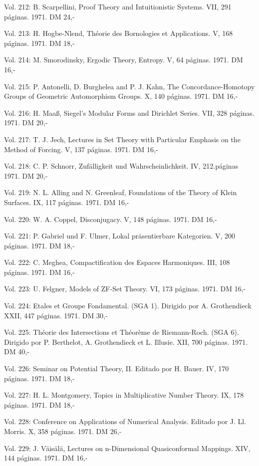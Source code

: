 Vol. 212: B. Scarpellini, Proof Theory and Intuitionistic Systems. VII, 291 páginas. 1971. DM 24,-

Vol. 213: H. Hogbe-Nlend, Théorie des Bornologies et Applications. V, 168 páginas. 1971. DM 18,-

Vol. 214: M. Smorodinsky, Ergodic Theory, Entropy. V, 64 páginas. 1971. DM 16,-

Vol. 215: P. Antonelli, D. Burghelea and P. J. Kahn, The Concordance-Homotopy Groups of Geometric Automorphism Groups. X, 140 páginas. 1971. DM 16,-

Vol. 216: H. Maaß, Siegel's Modular Forms and Dirichlet Series. VII, 328 páginas. 1971. DM 20,-

Vol. 217: T. J. Jech, Lectures in Set Theory with Particular Emphasis on the Method of Forcing. V, 137 páginas. 1971. DM 16,-

Vol. 218: C. P. Schnorr, Zufälligkeit und Wahrscheinlichkeit. IV, 212.páginas 1971. DM 20,-

Vol. 219: N. L. Alling and N. Greenleaf, Foundations of the Theory of Klein Surfaces. IX, 117 páginas. 1971. DM 16,-

Vol. 220: W. A. Coppel, Disconjugacy. V, 148 páginas. 1971. DM 16,-

Vol. 221: P. Gabriel und F. Ulmer, Lokal präsentierbare Kategorien. V, 200 páginas. 1971. DM 18,-

Vol. 222: C. Meghea, Compactification des Espaces Harmoniques. III, 108 páginas. 1971. DM 16,-

Vol. 223: U. Felgner, Models of ZF-Set Theory. VI, 173 páginas. 1971. DM 16,-

Vol. 224:  Etales et Groupe Fondamental. (SGA 1). Dirigido por A. Grothendieck XXII, 447 páginas. 1971. DM 30,-

Vol. 225: Théorie des Intersections et Théorème de Riemann-Roch. (SGA 6). Dirigido por P. Berthelot, A. Grothendieck et L. Illusie. XII, 700 páginas. 1971. DM 40,-

Vol. 226: Seminar on Potential Theory, II. Editado por H. Bauer. IV, 170 páginas. 1971. DM 18,-

Vol. 227: H. L. Montgomery, Topics in Multiplicative Number Theory. IX, 178 páginas. 1971. DM 18,-

Vol. 228: Conference on Applications of Numerical Analysis. Editado por J. Ll. Morris. X, 358 páginas. 1971. DM 26,-

Vol. 229: J. Väisälä, Lectures on n-Dimensional Quasiconformal Mappings. XIV, 144 páginas. 1971. DM 16,-

